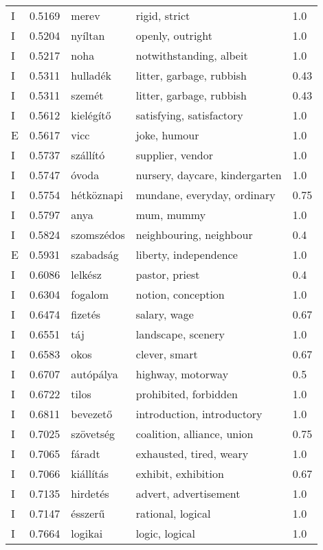 \documentclass[11pt]{article}
\begin{document}
\begin{table*}
{\begin{tabular}{lllll}
    I	& 0.5169	& merev	& rigid, strict	& 1.0 \\
    I	& 0.5204	& nyíltan	& openly, outright	& 1.0 \\
    I	& 0.5217	& noha	& notwithstanding, albeit	& 1.0 \\
    I	& 0.5311	& hulladék	& litter, garbage, rubbish	& 0.43 \\
    I	& 0.5311	& szemét	& litter, garbage, rubbish	& 0.43 \\
    I	& 0.5612	& kielégítő	& satisfying, satisfactory	& 1.0 \\
    E	& 0.5617	& vicc	& joke, humour	& 1.0 \\
    I	& 0.5737	& szállító	& supplier, vendor	& 1.0 \\
    I	& 0.5747	& óvoda	& nursery, daycare, kindergarten	& 1.0 \\
    I	& 0.5754	& hétköznapi	& mundane, everyday, ordinary	& 0.75 \\
    I	& 0.5797	& anya	& mum, mummy	& 1.0 \\
    I	& 0.5824	& szomszédos	& neighbouring, neighbour	& 0.4 \\
    E	& 0.5931	& szabadság	& liberty, independence	& 1.0 \\
    I	& 0.6086	& lelkész	& pastor, priest	& 0.4 \\
    I	& 0.6304	& fogalom	& notion, conception	& 1.0 \\
    I	& 0.6474	& fizetés	& salary, wage	& 0.67 \\
    I	& 0.6551	& táj	& landscape, scenery	& 1.0 \\
    I	& 0.6583	& okos	& clever, smart	& 0.67 \\
    I	& 0.6707	& autópálya	& highway, motorway	& 0.5 \\
    I	& 0.6722	& tilos	& prohibited, forbidden	& 1.0 \\
    I	& 0.6811	& bevezető	& introduction, introductory	& 1.0 \\
    I	& 0.7025	& szövetség	& coalition, alliance, union	& 0.75 \\
    I	& 0.7065	& fáradt	& exhausted, tired, weary	& 1.0 \\
    I	& 0.7066	& kiállítás	& exhibit, exhibition	& 0.67 \\
    I	& 0.7135	& hirdetés	& advert, advertisement	& 1.0 \\
    I	& 0.7147	& ésszerű	& rational, logical	& 1.0 \\
    I	& 0.7664	& logikai	& logic, logical	& 1.0 \\

\end{tabular}}
\end{table*}
\end{document}
